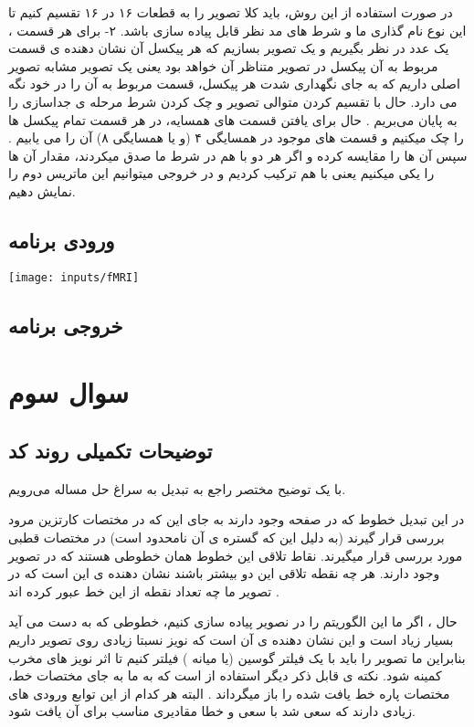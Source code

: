 \documentclass[12pt]{article}
\begin{document}
	در صورت استفاده از این روش، باید کلا تصویر را به قطعات ۱۶ در ۱۶ تقسیم کنیم تا این نوع نام گذاری ما و شرط های مد نظر قابل پیاده سازی باشد.
		۲- برای هر قسمت ، یک عدد در نظر بگیریم و یک تصویر بسازیم که هر پیکسل آن نشان دهنده ی قسمت مربوط به آن پیکسل در تصویر متناظر آن خواهد بود یعنی یک تصویر مشابه تصویر اصلی داریم که به جای نگهداری شدت هر پیکسل، قسمت مربوط به آن را در خود نگه می دارد. حال با تقسیم کردن متوالی تصویر و چک کردن شرط مرحله ی جداسازی را به پایان می‌بریم . حال برای یافتن قسمت های همسایه، در هر قسمت تمام پیکسل ها را چک میکنیم و قسمت های موجود در همسایگی ۴ (و یا همسایگی ۸) آن را می یابیم . سپس آن ها را مقایسه کرده و اگر هر دو با هم در شرط ما صدق میکردند، مقدار آن ها را یکی میکنیم یعنی با هم ترکیب کردیم و در خروجی میتوانیم این ماتریس دوم را نمایش دهیم.
		
		
		
		
		
		\subsection{ورودی برنامه}
		\texttt{[image: inputs/fMRI]}
		\subsection{خروجی برنامه}
		
		
		
		\newpage
		\section{سوال سوم}
		\subsection{توضیحات تکمیلی روند کد}
		با یک توضیح مختصر راجع به تبدیل 
		به سراغ حل مساله می‌رویم.
		
		در این تبدیل خطوط که در صفحه وجود دارند به جای این که در مختصات کارتزین مرود بررسی قرار گیرند (به دلیل این که گستره ی آن نامحدود است) در مختصات قطبی مورد بررسی قرار میگیرند. نقاط تلاقی این خطوط همان خطوطی هستند که در تصویر وجود دارند. هر چه نقطه تلاقی این دو بیشتر باشند نشان دهنده ی این است که در تصویر ما چه تعداد نقطه از این خط عبور کرده اند .
		
		حال ، اگر ما این الگوریتم را در نصویر پیاده سازی کنیم، خطوطی که به دست می آید بسیار زیاد است و این نشان دهنده ی آن است که نویز نسبتا زیادی روی تصویر داریم بنابراین ما تصویر را باید با یک فیلتر گوسین (یا میانه ) فیلتر کنیم تا اثر نویز های مخرب کمینه شود.
		نکته ی قابل ذکر دیگر استفاده از 
		است که به ما به جای مختصات خط، مختصات پاره خط یافت شده را باز میگرداند .
		البته هر کدام از این توابع ورودی های زیادی دارند که سعی شد با سعی و خطا مقادیری مناسب برای آن یافت شود.
		
\end{document}
